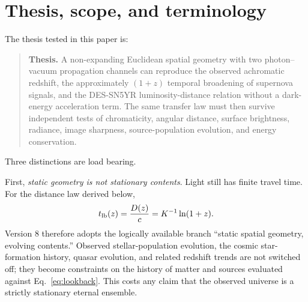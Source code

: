 \documentclass[11pt]{article}
\begin{document}
\begin{abstract}
The strongest present empirical threat is the Tolman surface-brightness test. The model predicts $D_A=D=(c/K)\ln(1+z)$ and $I\propto(1+z)^{-2}e^{-\tau_\lambda}$. Re-expressing the published Lubin--Sandage distance sensitivity in the static frame removes the nominal $I$-band crisis but moves tension to $R$; the approximately frame-invariant observed spread $n_I-n_R=0.78\pm0.21$ differs from the model prediction $\simeq-0.02$ by about 3.7$\sigma$ before a full static-frame re-reduction. The paper also closes the previously omitted forward-energy ledger: at $z=1$ the coherent frequency shift transfers 50\% of each photon's emitted energy out of the observed photon, while the non-forward branch removes a further 16\% of the surviving beam in rest $B$. Applying the same frequency drift to the microwave bath predicts the independently observed scaling $T_{\rm CMB}(z)=T_0(1+z)$; at $z=2.41837$ it gives 9.315 K versus $9.15\pm0.72$ K from CO excitation. This is a consistency success shared with FLRW, not a discriminator. Preserving Planck normalization in a static volume then requires an additional shape-preserving photon-number relaxation at rate $3K$, whose microphysics is not identified here, while the CMB acoustic/polarization/lensing and BAO-correlated structure remains unmodeled. Version 8 therefore does not claim a completed cosmology. It claims a sufficiently specified supernova alternative with explicit adverse tests and a finite microscopic closure problem suitable for human review.
\end{abstract}

\section{Thesis, scope, and terminology}
The thesis tested in this paper is:
\begin{quote}
\textbf{Thesis.} A non-expanding Euclidean spatial geometry with two photon--vacuum propagation channels can reproduce the observed achromatic redshift, the approximately $(1+z)$ temporal broadening of supernova signals, and the DES-SN5YR luminosity-distance relation without a dark-energy acceleration term. The same transfer law must then survive independent tests of chromaticity, angular distance, surface brightness, radiance, image sharpness, source-population evolution, and energy conservation.
\end{quote}

Three distinctions are load bearing.

First, \emph{static geometry is not stationary contents}. Light still has finite travel time. For the distance law derived below,
\begin{equation}
 t_{\rm lb}(z)=\frac{D(z)}{c}=K^{-1}\ln(1+z).
 \label{eq:lookback}
\end{equation}
Version 8 therefore adopts the logically available branch ``static spatial geometry, evolving contents.'' Observed stellar-population evolution, the cosmic star-formation history, quasar evolution, and related redshift trends are not switched off; they become constraints on the history of matter and sources evaluated against Eq.~\eqref{eq:lookback}. This costs any claim that the observed universe is a strictly stationary eternal ensemble.
\end{document}
